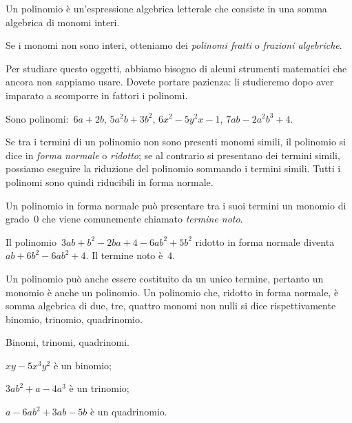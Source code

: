 \begin{definizione}
Un polinomio è un'espressione algebrica letterale che consiste in una somma 
algebrica di monomi interi.
\end{definizione}

\begin{osservazione}
Se i monomi non sono interi, otteniamo dei \emph{polinomi fratti} o 
\emph{frazioni algebriche}.

Per studiare questo oggetti, abbiamo bisogno di alcuni strumenti matematici 
che ancora non sappiamo usare. 
Dovete portare pazienza: li studieremo dopo aver imparato a scomporre in 
fattori i polinomi.
\end{osservazione}


\begin{exrig}
\begin{esempio}
Sono polinomi:~$6a+2b$, $5a^2b+3b^2$, $6x^2-5y^2x-1$, $7ab-2a^2b^3+4$.
\end{esempio}
\end{exrig}

Se tra i termini di un polinomio non sono presenti monomi simili, il 
polinomio si dice in \emph{forma normale} o
\emph{ridotto}; se al contrario si presentano dei termini simili, possiamo 
eseguire la riduzione del polinomio
sommando i termini simili. Tutti i polinomi sono quindi riducibili in forma 
normale.

Un polinomio in forma normale può presentare tra i suoi termini un monomio 
di grado~0 che viene
comunemente chiamato \emph{termine noto}.

\begin{exrig}
\begin{esempio}
Il polinomio~$3ab+b^2-2ba+4-6ab^2+5b^2$ ridotto in forma normale 
diventa~$ab+6b^2-6ab^2+4$. Il termine noto è~$4$.
\end{esempio}
\end{exrig}


Un polinomio può anche essere costituito da un unico termine, pertanto un 
monomio è anche un polinomio.
Un polinomio che, ridotto in forma normale, è somma algebrica di due, tre, 
quattro monomi non nulli si dice
rispettivamente binomio, trinomio, quadrinomio.

\begin{exrig}
\begin{esempio}
Binomi, trinomi, quadrinomi.
\begin{enumeratea}
\item $xy-5x^3y^2$ è un binomio;
\item $3ab^2 +a-4a^3$ è un trinomio;
\item $a-6ab^2+3ab-5b$ è un quadrinomio.
\end{enumeratea}
\end{esempio}
\end{exrig}

